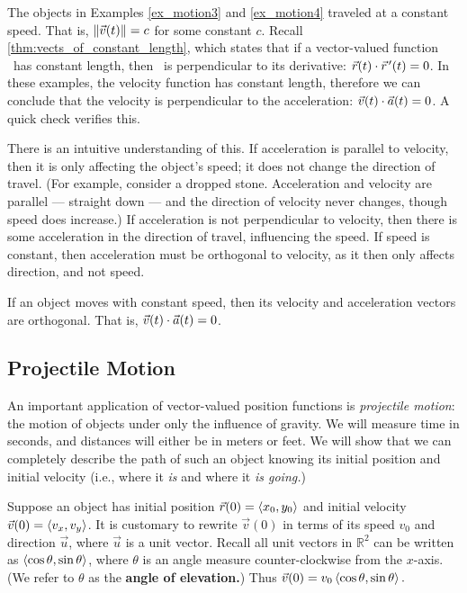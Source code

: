 The objects in Examples \ref{ex_motion3} and \ref{ex_motion4} traveled at a constant speed. That is, $\left\lVert \vec v(t) \right\rVert = c$ for some constant $c$. Recall \autoref{thm:vects_of_constant_length}, which states that if a vector-valued function \vrt\ has constant length, then \vrt\ is perpendicular to its derivative: $\vec r(t)\cdot\vec r\hskip1.25pt '(t) = 0$. In these examples, the velocity function has constant length, therefore we can conclude that the velocity is perpendicular to the acceleration: $\vec v(t)\cdot\vec a(t) = 0$. A quick check verifies this.

There is an intuitive understanding of this. If acceleration is parallel to velocity, then it is only affecting the object's speed; it does not change the direction of travel. (For example, consider a dropped stone. Acceleration and velocity are parallel --- straight down --- and the direction of velocity never changes, though speed does increase.) If acceleration is not perpendicular to velocity, then there is some acceleration in the direction of travel, influencing the speed. If speed is constant, then acceleration must be orthogonal to velocity, as it then only affects direction, and not speed.

\begin{keyidea}\label{idea:constant_speed}%
If an object moves with constant speed, then its velocity and acceleration vectors are orthogonal. That is, $\vec v(t)\cdot\vec a(t)=0$.
\end{keyidea}


\subsection{Projectile Motion}

An important application of vector-valued position functions is \emph{projectile motion}: the motion of objects under only the influence of gravity. We will measure time in seconds, and distances will either be in meters or feet. We will show that we can completely describe the path of such an object knowing its initial position and initial velocity (i.e., where it \emph{is} and where it \emph{is going.})

Suppose an object has initial position $\vec r(0) =\left\langle x_0,y_0\right\rangle$ and initial velocity $\vec v(0) =\left\langle v_x,v_y\right\rangle$. It is customary to rewrite $\vec v(0)$ in terms of its speed $v_0$ and direction $\vec u$, where $\vec u$ is a unit vector. Recall all unit vectors in $\mathbb{R}^2$ can be written as $\left\langle \cos \theta,\sin \theta\right\rangle$, where $\theta$ is an angle measure counter-clockwise from the $x$-axis. (We refer to $\theta$ as the \textbf{angle of elevation.}) Thus $\vec v(0) = v_0\left\langle \cos \theta,\sin \theta\right\rangle.$ 

